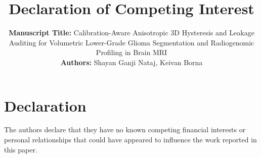 \documentclass[12pt]{article}
\title{\textbf{Declaration of Competing Interest}}
\author{
  \parbox{0.9\textwidth}{\centering
  \textbf{Manuscript Title:} Calibration-Aware Anisotropic 3D Hysteresis and Leakage Auditing for Volumetric Lower-Grade Glioma Segmentation and Radiogenomic Profiling in Brain MRI\\[0.8em]
  \textbf{Authors:} Shayan Ganji Nataj, Keivan Borna
  }
}
\date{}
\begin{document}
\maketitle

\section*{Declaration}
The authors declare that they have no known competing financial interests or personal relationships that could have appeared to influence the work reported in this paper.
\end{document}
